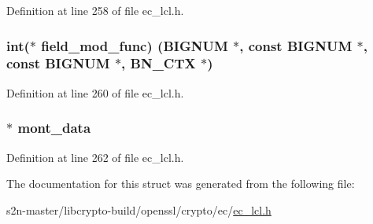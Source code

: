 Definition at line 258 of file ec\+\_\+lcl.\+h.

\subsubsection[{\texorpdfstring{field\+\_\+mod\+\_\+func}{field_mod_func}}]{\setlength{\rightskip}{0pt plus 5cm}int($\ast$ field\+\_\+mod\+\_\+func) ({\bf B\+I\+G\+N\+UM} $\ast$, const {\bf B\+I\+G\+N\+UM} $\ast$, const {\bf B\+I\+G\+N\+UM} $\ast$, {\bf B\+N\+\_\+\+C\+TX} $\ast$)}\hypertarget{structec__group__st_a2dddf08e66879e1949ce622cf6c384d8}{}\label{structec__group__st_a2dddf08e66879e1949ce622cf6c384d8}


Definition at line 260 of file ec\+\_\+lcl.\+h.

\subsubsection[{\texorpdfstring{mont\+\_\+data}{mont_data}}]{$\ast$ mont\+\_\+data}\hypertarget{structec__group__st_a4f816320c2bd645dc74414f7e321a4d4}{}\label{structec__group__st_a4f816320c2bd645dc74414f7e321a4d4}


Definition at line 262 of file ec\+\_\+lcl.\+h.



The documentation for this struct was generated from the following file\+:\begin{DoxyCompactItemize}
\item 
s2n-\/master/libcrypto-\/build/openssl/crypto/ec/\hyperlink{ec__lcl_8h}{ec\+\_\+lcl.\+h}\end{DoxyCompactItemize}
